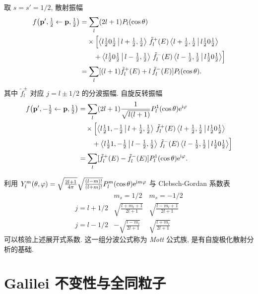 \begin{example}[自旋 $1/2$-自旋 $0$ 散射: 分波展开]
取 $s=s'=1/2$, 散射振幅
\begin{align}
f\bigl(\mathbf{p}',\tfrac{1}{2}\leftarrow \mathbf{p},\tfrac{1}{2}\bigr)&=\sum_l (2l+1)P_l(\cos\theta)\nonumber\\
&\quad\times \Bigl[\left\langle l\tfrac{1}{2}0\tfrac{1}{2} \,\middle|\, l+\tfrac{1}{2},\tfrac{1}{2} \right\rangle\,\tilde{f}^+_l(E)\left\langle l+\tfrac{1}{2},\tfrac{1}{2} \,\middle|\, l\tfrac{1}{2}0\tfrac{1}{2} \right\rangle\nonumber\\
&\qquad+\left\langle l\tfrac{1}{2}0\tfrac{1}{2} \,\middle|\, l-\tfrac{1}{2},\tfrac{1}{2} \right\rangle\,\tilde{f}^-_l(E)\left\langle l-\tfrac{1}{2},\tfrac{1}{2} \,\middle|\, l\tfrac{1}{2}0\tfrac{1}{2} \right\rangle\Bigr]\nonumber\\
&=\sum_l[(l+1)\tilde{f}^+_l(E)+l\,\tilde{f}^-_l(E)]P_l(\cos\theta).
\end{align}
其中 $\tilde{f}^\pm_l$ 对应 $j=l\pm 1/2$ 的分波振幅. 自旋反转振幅
\begin{align}
f\bigl(\mathbf{p}',-\tfrac{1}{2}\leftarrow \mathbf{p},\tfrac{1}{2}\bigr)&=\sum_l (2l+1)\frac{1}{\sqrt{l(l+1)}}P_l^1(\cos\theta)\mathrm{e}^{\mathrm{i} \varphi}\nonumber\\
&\quad\times \Bigl[\left\langle l\tfrac{1}{2}1,-\tfrac{1}{2} \,\middle|\, l+\tfrac{1}{2},\tfrac{1}{2} \right\rangle\,\tilde{f}^+_l(E)\left\langle l+\tfrac{1}{2},\tfrac{1}{2} \,\middle|\, l\tfrac{1}{2}0\tfrac{1}{2} \right\rangle\nonumber\\
&\qquad+\left\langle l\tfrac{1}{2}1,-\tfrac{1}{2} \,\middle|\, l-\tfrac{1}{2},\tfrac{1}{2} \right\rangle\,\tilde{f}^-_l(E)\left\langle l-\tfrac{1}{2},\tfrac{1}{2} \,\middle|\, l\tfrac{1}{2}0\tfrac{1}{2} \right\rangle\Bigr]\nonumber\\
&=\sum_l[\tilde{f}^+_l(E)-\tilde{f}^-_l(E)]P_l^1(\cos\theta)\mathrm{e}^{\mathrm{i} \varphi}.
\end{align}
\end{example}

利用 $Y_l^m(\theta,\varphi)=\sqrt{\frac{2l+1}{4\pi}}\sqrt{\frac{(l-m)!}{(l+m)!}}P_l^m(\cos\theta)\mathrm{e}^{\mathrm{i} m\varphi}$ 与 Clebsch-Gordan 系数表
\[
\begin{array}{c|cc}
& m_s=1/2 & m_s=-1/2 \\\hline
j=l+1/2 & \sqrt{\tfrac{l+m_l+1}{2l+1}} & \sqrt{\tfrac{l-m_l+1}{2l+1}} \\
j=l-1/2 & -\sqrt{\tfrac{l-m_l}{2l+1}} & \sqrt{\tfrac{l+m_l}{2l+1}}
\end{array}
\]
可以核验上述展开式系数. 这一组分波公式称为 \emph{Mott} 公式族, 是有自旋极化散射分析的基础.


\section{Galilei 不变性与全同粒子}\label{sec:galilei-identical}

